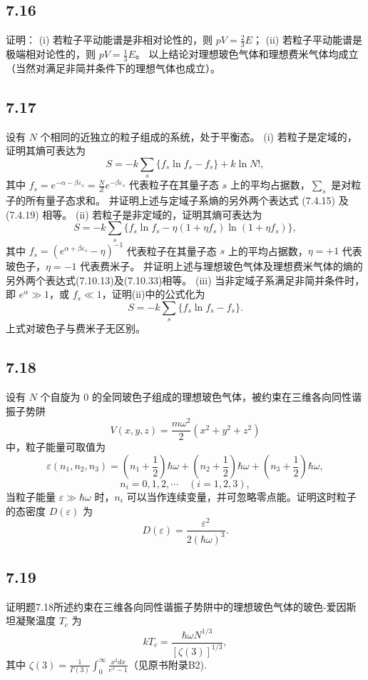 \newpage
\subsection{7.16}
证明：
(i) 若粒子平动能谱是非相对论性的，则 $pV=\frac{2}{3}E$；
(ii) 若粒子平动能谱是极端相对论性的，则 $pV=\frac{1}{3}E$。
以上结论对理想玻色气体和理想费米气体均成立（当然对满足非简并条件下的理想气体也成立）。

\newpage
\subsection{7.17}
设有 $N$ 个相同的近独立的粒子组成的系统，处于平衡态。
(i) 若粒子是定域的，证明其熵可表达为
$$S = -k \sum_s \{ f_s \ln f_s - f_s \} + k \ln N! ,$$
其中 $f_s = e^{-\alpha - \beta \varepsilon_s} = \frac{N}{Z} e^{-\beta \varepsilon_s}$ 代表粒子在其量子态 $s$ 上的平均占据数，$\sum_s$ 是对粒子的所有量子态求和。
并证明上述与定域子系熵的另外两个表达式 (7.4.15) 及 (7.4.19) 相等。
(ii) 若粒子是非定域的，证明其熵可表达为
$$S = -k \sum_s \{ f_s \ln f_s - \eta (1 + \eta f_s) \ln (1 + \eta f_s) \},$$
其中 $f_s = (e^{\alpha + \beta \varepsilon_s} - \eta)^{-1}$ 代表粒子在其量子态 $s$ 上的平均占据数，$\eta = +1$ 代表玻色子，$\eta = -1$ 代表费米子。
并证明上述与理想玻色气体及理想费米气体的熵的另外两个表达式(7.10.13)及(7.10.33)相等。
(iii) 当非定域子系满足非简并条件时，即 $e^\alpha \gg 1$，或 $f_s \ll 1$，证明(ii)中的公式化为
$$S = -k \sum_s \{f_s \ln f_s - f_s\}.$$
上式对玻色子与费米子无区别。

\newpage
\subsection{7.18}
设有 $N$ 个自旋为 0 的全同玻色子组成的理想玻色气体，被约束在三维各向同性谐振子势阱
$$V(x,y,z) = \frac{m\omega^{2}}{2} (x^{2} + y^{2} + z^{2})$$
中，粒子能量可取值为
$$\varepsilon (n_{1}, n_{2}, n_{3}) = \left( n_{1} + \frac{1}{2} \right) \hbar \omega + \left( n_{2} + \frac{1}{2} \right) \hbar \omega + \left( n_{3} + \frac{1}{2} \right) \hbar \omega,$$
$$n_{i} = 0, 1, 2, \cdots \quad (i = 1, 2, 3),$$
当粒子能量 $\varepsilon \gg \hbar\omega$ 时，$n_i$ 可以当作连续变量，并可忽略零点能。证明这时粒子的态密度 $D(\varepsilon)$ 为
$$D(\varepsilon) = \frac{\varepsilon^2}{2(\hbar\omega)^3}.$$

\newpage
\subsection{7.19}
证明题7.18所述约束在三维各向同性谐振子势阱中的理想玻色气体的玻色-爱因斯坦凝聚温度 $T_c$ 为
$$k T_c = \frac{\hbar \omega N^{1/3}}{[\zeta(3)]^{1/3}},$$
其中 $\zeta(3) = \frac{1}{\Gamma(3)} \int_{0}^{\infty} \frac{x^2 dx}{e^x - 1}$（见原书附录B2).

